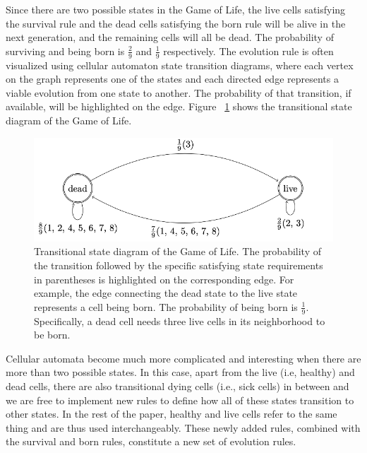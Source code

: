 \documentclass[12pt]{article}
\numberwithin{figure}{section} %
\begin{document}
Since there are two possible states in the Game of Life, the live cells satisfying the survival rule and the dead cells satisfying the born rule will be alive in the next generation, and the remaining cells will all be dead. The probability of surviving and being born is $\frac{2}{9}$ and $\frac{1}{9}$ respectively. The evolution rule is often visualized using cellular automaton state transition diagrams, where each vertex on the graph represents one of the states and each directed edge represents a viable evolution from one state to another. The probability of that transition, if available, will be highlighted on the edge. Figure ~\ref{fig:Transitional state diagram of the Game of Life} shows the transitional state diagram of the Game of Life. 

\begin{figure}[H]
	\centering
	\includegraphics[width=\linewidth]{Section1/3}
	\caption[Transitional state diagram of the Game of Life]{Transitional state diagram of the Game of Life. The probability of the transition followed by the specific satisfying state requirements in parentheses is highlighted on the corresponding edge. For example, the edge connecting the dead state to the live state represents a cell being born. The probability of being born is $\frac{1}{9}$. Specifically, a dead cell needs three live cells in its neighborhood to be born.}
	\label{fig:Transitional state diagram of the Game of Life}
	\vspace{-1.5em}
\end{figure}

Cellular automata become much more complicated and interesting when there are more than two possible states. In this case, apart from the live (i.e, healthy) and dead cells, there are also transitional dying cells (i.e., sick cells) in between and we are free to implement new rules to define how all of these states transition to other states. In the rest of the paper, healthy and live cells refer to the same thing and are thus used interchangeably. These newly added rules, combined with the survival and born rules, constitute a new set of evolution rules. 
\end{document}

